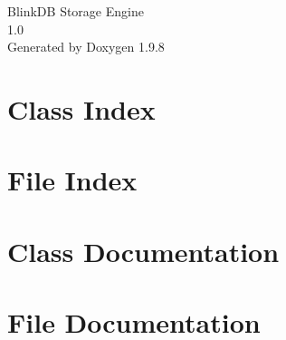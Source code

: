 \documentclass[twoside]{book}
\newcommand{\+}{\discretionary{\mbox{\scriptsize$\hookleftarrow$}}{}{}}
\newcommand{\clearemptydoublepage}{%
    \newpage{\pagestyle{empty}\cleardoublepage}%
  }
\begin{document}
  \raggedbottom
    \hypersetup{pageanchor=false,
                bookmarksnumbered=true,
                pdfencoding=unicode
               }
  \begin{titlepage}
  \vspace*{7cm}
  \begin{center}%
  {\Large Blink\+DB Storage Engine}\\
  [1ex]\large 1.\+0 \\
  \vspace*{1cm}
  {\large Generated by Doxygen 1.9.8}\\
  \end{center}
  \end{titlepage}
  \clearemptydoublepage
  \tableofcontents
  \clearemptydoublepage
  \hypersetup{pageanchor=true}
\chapter{Class Index}

\chapter{File Index}

\chapter{Class Documentation}




\chapter{File Documentation}





  \backmatter
  \newpage
  \clearemptydoublepage
  \printindex
\end{document}

